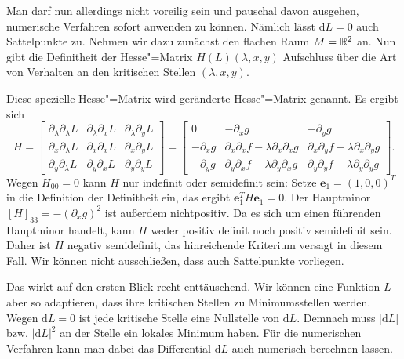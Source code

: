 Man darf nun allerdings nicht voreilig sein und pauschal davon
ausgehen, numerische Verfahren sofort anwenden zu können. Nämlich
lässt $\mathrm dL=0$ auch Sattelpunkte zu.
Nehmen wir dazu zunächst den flachen Raum $M=\mathbb R^2$ an. Nun gibt
die Definitheit der Hesse"=Matrix $H(L)(\lambda,x,y)$ Aufschluss
über die Art von Verhalten an den kritischen Stellen $(\lambda,x,y)$.

Diese spezielle Hesse"=Matrix wird geränderte Hesse"=Matrix genannt.
Es ergibt sich%
\begin{equation}
H = \begin{bmatrix}
\partial_\lambda\partial_\lambda L & \partial_\lambda\partial_x L & \partial_\lambda \partial_y L\\
\partial_x\partial_\lambda L & \partial_x\partial_x L & \partial_x\partial_y L\\
\partial_y\partial_\lambda L & \partial_y\partial_x L & \partial_y\partial_y L
\end{bmatrix}
= \begin{bmatrix}
0
& -\partial_x g
& -\partial_y g\\
-\partial_x g
& \partial_x\partial_x f-\lambda\partial_x\partial_x g
& \partial_x\partial_y f-\lambda\partial_x\partial_y g\\
-\partial_y g
& \partial_y\partial_x f-\lambda\partial_y\partial_x g
& \partial_y\partial_y f-\lambda\partial_y\partial_y g
\end{bmatrix}.
\end{equation}
Wegen $H_{00}=0$ kann $H$ nur indefinit oder
semidefinit sein: Setze $\mathbf e_1=(1,0,0)^T$ in die Definition der
Definitheit ein, das ergibt $\mathbf e_1^T H\mathbf e_1 = 0$. Der
Hauptminor $[H]_{33} = -(\partial_x g)^2$ ist außerdem nichtpositiv.
Da es sich um einen führenden Hauptminor handelt,
kann $H$ weder positiv definit noch positiv semidefinit sein. Daher
ist $H$ negativ semidefinit, das hinreichende Kriterium versagt
in diesem Fall. Wir können nicht ausschließen, dass auch Sattelpunkte
vorliegen.

Das wirkt auf den ersten Blick recht enttäuschend. Wir können
eine Funktion $L$ aber so adaptieren, dass ihre kritischen Stellen zu
Minimumsstellen werden. Wegen $\mathrm dL=0$ ist jede kritische
Stelle eine Nullstelle von $\mathrm dL$. Demnach muss
$|\mathrm dL|$ bzw. $|\mathrm dL|^2$ an der Stelle ein
lokales Minimum haben. Für die numerischen Verfahren kann man dabei
das Differential $\mathrm dL$ auch numerisch berechnen lassen.



